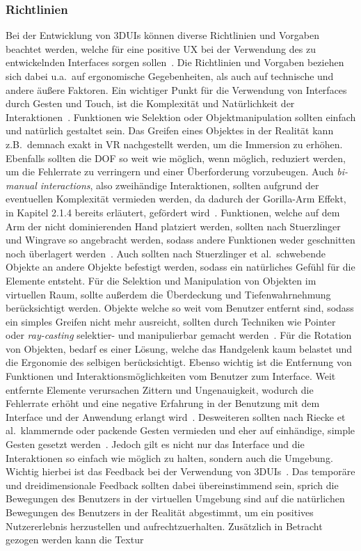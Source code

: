 \subsubsection{Richtlinien}
Bei der Entwicklung von 3DUIs können diverse Richtlinien und Vorgaben beachtet werden, welche für eine positive UX bei der Verwendung des zu entwickelnden Interfaces sorgen sollen~\citep{interactionpatterns}. Die Richtlinien und Vorgaben beziehen sich dabei u.a.~auf ergonomische Gegebenheiten, als auch auf technische und andere äußere Faktoren. Ein wichtiger Punkt für die Verwendung von Interfaces durch Gesten und Touch, ist die Komplexität und Natürlichkeit der Interaktionen~\cite{asurveyon3dobjectmanipulation}. Funktionen wie Selektion oder Objektmanipulation sollten einfach und natürlich gestaltet sein. Das Greifen eines Objektes in der Realität kann z.B.~demnach exakt in VR nachgestellt werden, um die Immersion zu erhöhen. Ebenfalls sollten die DOF so weit wie möglich, wenn möglich, reduziert werden, um die Fehlerrate zu verringern und einer Überforderung vorzubeugen. Auch \textit{bi-manual interactions}, also zweihändige Interaktionen, sollten aufgrund der eventuellen Komplexität vermieden werden, da dadurch der Gorilla-Arm Effekt, in Kapitel 2.1.4 bereits erläutert, gefördert wird~\cite{asurveyon3dobjectmanipulation}. Funktionen, welche auf dem Arm der nicht dominierenden Hand platziert werden, sollten nach Stuerzlinger und Wingrave so angebracht werden, sodass andere Funktionen weder geschnitten noch überlagert werden~\cite{constraints3duis}. Auch sollten nach Stuerzlinger et al.~schwebende Objekte an andere Objekte befestigt werden, sodass ein natürliches Gefühl für die Elemente entsteht. Für die Selektion und Manipulation von Objekten im virtuellen Raum, sollte außerdem die Überdeckung und Tiefenwahrnehmung berücksichtigt werden. Objekte welche so weit vom Benutzer entfernt sind, sodass ein simples Greifen nicht mehr ausreicht, sollten durch Techniken wie Pointer oder \textit{ray-casting} selektier- und manipulierbar gemacht werden~\cite{anintroductionto3dspacial}. Für die Rotation von Objekten, bedarf es einer Lösung, welche das Handgelenk kaum belastet und die Ergonomie des selbigen berücksichtigt. Ebenso wichtig ist die Entfernung von Funktionen und Interaktionsmöglichkeiten vom Benutzer zum Interface. Weit entfernte Elemente verursachen Zittern und Ungenauigkeit, wodurch die Fehlerrate erhöht und eine negative Erfahrung in der Benutzung mit dem Interface und der Anwendung erlangt wird~\cite{anintroductionto3dspacial}. Desweiteren sollten nach Riecke et al.~klammernde oder packende Gesten vermieden und eher auf einhändige, simple Gesten gesetzt werden~\cite{virtualrealityandgames}. Jedoch gilt es nicht nur das Interface und die Interaktionen so einfach wie möglich zu halten, sondern auch die Umgebung. Wichtig hierbei ist das Feedback bei der Verwendung von 3DUIs~\cite{theoryandpracticebook}. Das temporäre und dreidimensionale Feedback sollten dabei übereinstimmend sein, sprich die Bewegungen des Benutzers in der virtuellen Umgebung sind auf die natürlichen Bewegungen des Benutzers in der Realität abgestimmt, um ein positives Nutzererlebnis herzustellen und aufrechtzuerhalten. Zusätzlich in Betracht gezogen werden kann die Textur 